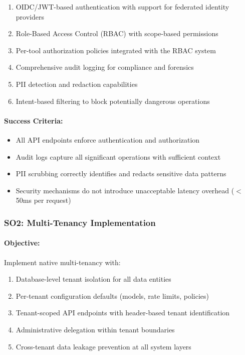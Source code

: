 \begin{enumerate}[label=\alph*)]
    \item OIDC/JWT-based authentication with support for federated identity providers
    \item Role-Based Access Control (RBAC) with scope-based permissions
    \item Per-tool authorization policies integrated with the RBAC system
    \item Comprehensive audit logging for compliance and forensics
    \item PII detection and redaction capabilities
    \item Intent-based filtering to block potentially dangerous operations
\end{enumerate}

\paragraph{Success Criteria:}
\begin{itemize}
    \item All API endpoints enforce authentication and authorization
    \item Audit logs capture all significant operations with sufficient context
    \item PII scrubbing correctly identifies and redacts sensitive data patterns
    \item Security mechanisms do not introduce unacceptable latency overhead ($<$50ms per request)
\end{itemize}

\subsubsection{SO2: Multi-Tenancy Implementation}

\paragraph{Objective:} Implement native multi-tenancy with:

\begin{enumerate}[label=\alph*)]
    \item Database-level tenant isolation for all data entities
    \item Per-tenant configuration defaults (models, rate limits, policies)
    \item Tenant-scoped API endpoints with header-based tenant identification
    \item Administrative delegation within tenant boundaries
    \item Cross-tenant data leakage prevention at all system layers
\end{enumerate}

